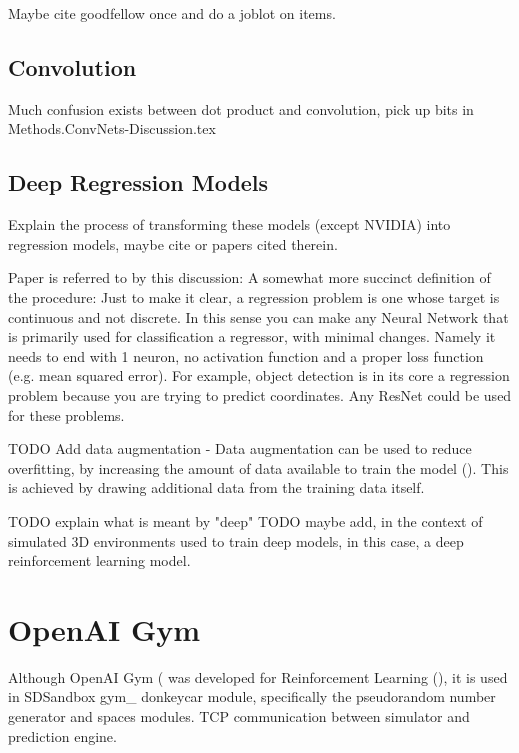 Maybe cite goodfellow once and do a joblot on items.  

\subsection{Convolution}
Much confusion exists between dot product and convolution, pick up bits in Methods.ConvNets-Discussion.tex

\subsection{Deep Regression Models}
Explain the process of transforming these models (except NVIDIA) into regression models, maybe cite \cite{lathuilire2018comprehensive} or papers cited therein.

Paper is referred to by this discussion: 
A somewhat more succinct definition of the procedure:  
Just to make it clear, a regression problem is one whose target is continuous and not discrete. In this sense you can make any Neural Network that is primarily used for classification a regressor, with minimal changes. Namely it needs to end with 1 neuron, no activation function and a proper loss function (e.g. mean squared error). For example, object detection is in its core a regression problem because you are trying to predict coordinates. Any ResNet could be used for these problems. 
  
TODO Add data augmentation - Data augmentation can be used to reduce overfitting, by increasing the amount of data available to train the model (\cite{perez2017effectiveness}). This is achieved by drawing additional data from the training data itself.  
  
TODO explain what is meant by "deep" 
TODO maybe add, in the context of simulated 3D environments used to train deep models, in this case, a deep reinforcement learning model.
\section{OpenAI Gym}
Although OpenAI Gym (\cite{brockman2016openai)} was developed for Reinforcement Learning (\cite{sutton2018reinforcement}), it is used in SDSandbox gym\_ donkeycar module, specifically the 
pseudorandom number generator and spaces modules. TCP communication between simulator and prediction engine.

